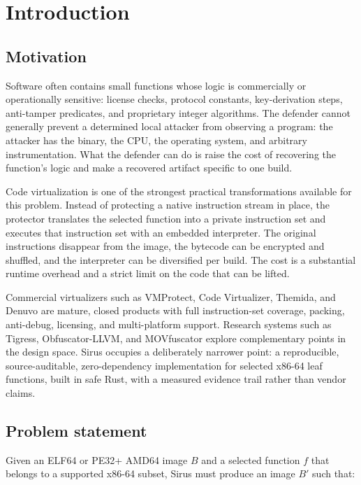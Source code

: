 \section{Introduction}

\subsection{Motivation}

Software often contains small functions whose logic is commercially or
operationally sensitive: license checks, protocol constants, key-derivation
steps, anti-tamper predicates, and proprietary integer algorithms. The defender
cannot generally prevent a determined local attacker from observing a program:
the attacker has the binary, the CPU, the operating system, and arbitrary
instrumentation. What the defender can do is raise the cost of recovering the
function's logic and make a recovered artifact specific to one build.

Code virtualization is one of the strongest practical transformations available
for this problem. Instead of protecting a native instruction stream in place, the
protector translates the selected function into a private instruction set and
executes that instruction set with an embedded interpreter. The original
instructions disappear from the image, the bytecode can be encrypted and
shuffled, and the interpreter can be diversified per build. The cost is a
substantial runtime overhead and a strict limit on the code that can be lifted.

Commercial virtualizers such as VMProtect, Code Virtualizer, Themida, and
Denuvo are mature, closed products with full instruction-set coverage, packing,
anti-debug, licensing, and multi-platform support. Research systems such as
Tigress, Obfuscator-LLVM, and MOVfuscator explore complementary points in the
design space. Sirus occupies a deliberately narrower point: a reproducible,
source-auditable, zero-dependency implementation for selected x86-64 leaf
functions, built in safe Rust, with a measured evidence trail rather than
vendor claims.

\subsection{Problem statement}

Given an ELF64 or PE32+ AMD64 image $B$ and a selected function $f$ that belongs
to a supported x86-64 subset, Sirus must produce an image $B'$ such that:

